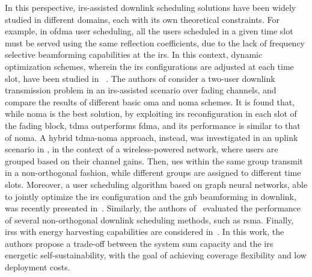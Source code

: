 In this perspective, \gls{irs}-assisted downlink scheduling solutions have been widely studied in different domains, each with its own theoretical constraints.
For example, in \gls{ofdma} user scheduling, all the users scheduled in a given time slot must be served using the same reflection coefficients, due to the lack of frequency selective beamforming capabilities at the \gls{irs}. In this context, dynamic optimization schemes, wherein the \gls{irs} configurations are adjusted at each time slot, have been studied in ~\cite{Yang20IRS, Lee23Harmony}.
The authors of \cite{guo2021intelligent} consider a two-user downlink transmission problem in an \gls{irs}-assisted scenario over fading channels, and compare the results of different basic \gls{oma} and \gls{noma} schemes. It is found that, while \gls{noma} is the best solution, by exploiting \gls{irs} reconfiguration in each slot of the fading block, \gls{tdma} outperforms \gls{fdma}, and its performance is similar to that of \gls{noma}.
A hybrid \gls{tdma}-\gls{noma} approach, instead, was investigated in
an uplink scenario in \cite{zhang2021throughput, alobiedollah2023self}, in the context of a wireless-powered network, where users are grouped based on their channel gains. 
Then, \glspl{ue} within the same group transmit in a non-orthogonal fashion, while different groups are assigned to different time slots.
Moreover, a user scheduling algorithm based on graph neural networks, able to jointly optimize the \gls{irs} configuration and the \gls{gnb} beamforming in downlink, was recently presented in~\cite{Zhang22Learning}. 
Similarly, the authors of~\cite{Bansal21Rate, Fu21Resource, Zhuo22Partial} evaluated the performance of several non-orthogonal downlink scheduling methods, such as \gls{rsma}.
Finally, \glspl{irs} with energy harvesting capabilities are considered in~\cite{hu2021robust}. In this work, the authors propose a trade-off between the system sum capacity and the \gls{irs} energetic self-sustainability, with the goal of achieving coverage flexibility and low deployment costs.

